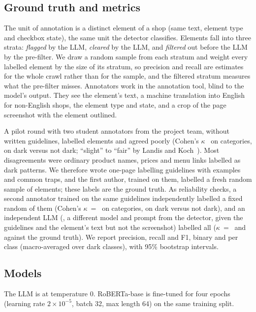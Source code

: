 \documentclass[conference]{IEEEtran}
\begin{document}
\subsection{Ground truth and metrics}\label{sec:annot}
The unit of annotation is a distinct element of a shop (same text, element type and checkbox state), the same
unit the detector classifies. Elements fall into three strata: \emph{flagged} by the LLM, \emph{cleared} by
the LLM, and \emph{filtered} out before the LLM by the pre-filter. We draw a random sample from each stratum
and weight every labelled element by the size of its stratum, so precision and recall are estimates for the
whole crawl rather than for the sample, and the filtered stratum measures what the pre-filter misses.
Annotators work in the annotation tool, blind to the model's output. They see the element's text, a
machine translation into English for non-English shops, the element type and state, and a crop of the page
screenshot with the element outlined.

A pilot round with two student annotators from the project team, without written guidelines, labelled
\PilotN{} elements and agreed poorly (Cohen's $\kappa$~\cite{cohen1960} \PilotKappa{} on categories,
\PilotKappaBin{} on dark versus not dark; ``slight'' to ``fair'' by Landis and Koch~\cite{landis1977}). Most
disagreements were ordinary product names, prices and menu links labelled as dark patterns. We therefore wrote
one-page labelling guidelines with examples and common traps, and the first author, trained on them, labelled
a fresh random sample of \ExpertN{} elements; these labels are the ground truth. As reliability checks, a
second annotator trained on the same guidelines independently labelled a fixed random \SecondN{} of them
(Cohen's $\kappa$~=~\SecondKappa{} on categories, \SecondKappaBin{} on dark versus not dark), and an independent LLM (\ModelOpName{}, a different model and prompt from the detector,
given the guidelines and the element's text but not the screenshot) labelled all \ExpertN{}
($\kappa$~=~\ModelOpKappa{} and \ModelOpKappaBin{} against the ground truth). We report precision, recall
and F1, binary and per class (macro-averaged over dark classes), with 95\% bootstrap intervals.

\subsection{Models}
The LLM is \LLMmodel{} at temperature 0. RoBERTa-base is fine-tuned for four epochs (learning rate
$2{\times}10^{-5}$, batch 32, max length 64) on the same training split.
\end{document}
